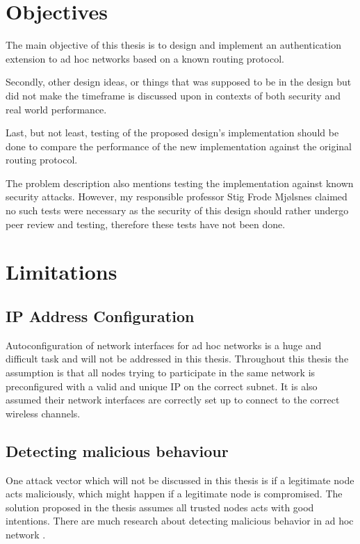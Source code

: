 \section{Objectives}
The main objective of this thesis is to design and implement an authentication
extension to ad hoc networks based on a known routing protocol.

Secondly, other design ideas, or things that was supposed to be in the design
but did not make the timeframe is discussed upon in contexts of both security
and real world performance.

Last, but not least, testing of the proposed design's implementation should be
done to compare the performance of the new implementation against the original
routing protocol.

The problem description also mentions testing the implementation against known
security attacks. However, my responsible professor Stig Frode Mj{\o}lsnes
claimed no such tests were necessary as the security of this design should
rather undergo peer review and testing, therefore these tests have not been
done.

\section{Limitations}

\subsection{IP Address Configuration}
\label{limit:ip_address_conf}
Autoconfiguration of network interfaces for ad hoc networks is a huge and
difficult task and will not be addressed in this thesis. Throughout this thesis
the assumption is that all nodes trying to participate in the same network is
preconfigured with a valid and unique IP on the correct subnet. It is also
assumed their network interfaces are correctly set up to connect to the correct
wireless channels.

\subsection{Detecting malicious behaviour}
\label{limit:malicious_behaviour}
One attack vector which will not be discussed in this thesis is if a legitimate
node acts maliciously, which might happen if a legitimate node is compromised.
The solution proposed in the thesis assumes all trusted nodes acts with good
intentions. There are much research about detecting malicious behavior in ad
hoc network \cite{Pirzada_McDonald} \cite{dhurandher2010network}.

